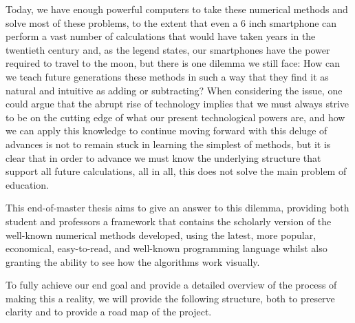 Today, we have enough powerful computers to take these numerical methods and solve most of these problems, to the extent that even a 6 inch smartphone can perform a vast number of calculations that would have taken years in the twentieth century and, as the legend states, our smartphones have the power required to travel to the moon, but there is one dilemma we still face: How can we teach future generations these methods in such a way that they find it as natural and intuitive as adding or subtracting? When considering the issue, one could argue that the abrupt rise of technology implies that we must always strive to be on the cutting edge of what our present technological powers are, and how we can apply this knowledge to continue moving forward with this deluge of advances is not to remain stuck in learning the simplest of methods, but it is clear that in order to advance we must know the underlying structure that support all future calculations, all in all, this does not solve the main problem of education.


This end-of-master thesis aims to give an answer to this dilemma, providing both student and professors a framework that contains the scholarly version of the well-known numerical methods developed, using the latest, more popular, economical, easy-to-read, and well-known programming language whilst also granting the ability to see how the algorithms work visually.  

To fully achieve our end goal and provide a detailed overview of the process of making this a reality, we will provide the following structure, both to preserve clarity and to provide a road map of the project. 

